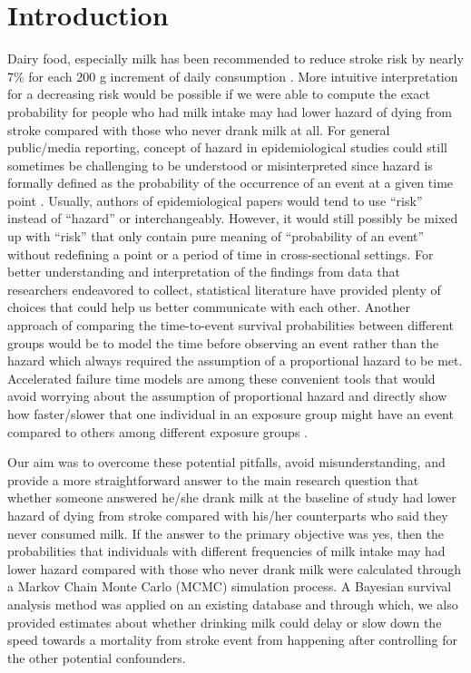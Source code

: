 \documentclass[nutrients,article,submit,moreauthors,pdftex]{mdpi}
\begin{document}

\hypertarget{introduction}{%
\section{Introduction}\label{introduction}}

Dairy food, especially milk has been recommended to reduce stroke risk
by nearly 7\% for each 200 g increment of daily consumption
\citep{DeGoede2016}. More intuitive interpretation for a decreasing risk
would be possible if we were able to compute the exact probability for
people who had milk intake may had lower hazard of dying from stroke
compared with those who never drank milk at all. For general
public/media reporting, concept of hazard in epidemiological studies
could still sometimes be challenging to be understood or misinterpreted
since hazard is formally defined as the probability of the occurrence of
an event at a given time point \citep{collett2015modelling}. Usually,
authors of epidemiological papers would tend to use ``risk'' instead of
``hazard'' or interchangeably. However, it would still possibly be mixed
up with ``risk'' that only contain pure meaning of ``probability of an
event'' without redefining a point or a period of time in
cross-sectional settings. For better understanding and interpretation of
the findings from data that researchers endeavored to collect,
statistical literature have provided plenty of choices that could help
us better communicate with each other. Another approach of comparing the
time-to-event survival probabilities between different groups would be
to model the time before observing an event rather than the hazard which
always required the assumption of a proportional hazard to be met.
Accelerated failure time models are among these convenient tools that
would avoid worrying about the assumption of proportional hazard and
directly show how faster/slower that one individual in an exposure group
might have an event compared to others among different exposure groups
\citep{Wei1992}.

Our aim was to overcome these potential pitfalls, avoid
misunderstanding, and provide a more straightforward answer to the main
research question that whether someone answered he/she drank milk at the
baseline of study had lower hazard of dying from stroke compared with
his/her counterparts who said they never consumed milk. If the answer to
the primary objective was yes, then the probabilities that individuals
with different frequencies of milk intake may had lower hazard compared
with those who never drank milk were calculated through a Markov Chain
Monte Carlo (MCMC) simulation process. A Bayesian survival analysis
method was applied on an existing database and through which, we also
provided estimates about whether drinking milk could delay or slow down
the speed towards a mortality from stroke event from happening after
controlling for the other potential confounders.
\end{document}
